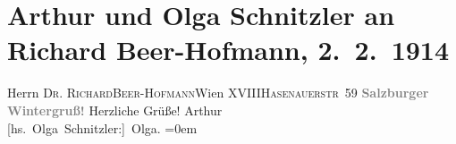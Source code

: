 

         
         \renewcommand{\erwaehntePersonen}{Personen: Richard Beer-Hofmann}
         \renewcommand{\erwaehnteOrte}{Orte: Hasenauerstraße, Salzburg, Wien, XVIII., Währing}
         \renewcommand{\erwaehnteWerke}{}
               \section[Arthur und Olga Schnitzler an Richard Beer-Hofmann, 2. 2. 1914]{ Arthur und Olga Schnitzler an Richard Beer-Hofmann,
                    2. 2. 1914}\nopagebreak{}\rehead{ }\begin{ledgroupsized}[t]{13cm}\normalsize\beginnumbering \toendnotes[C]{\smallbreak\pagebreak[2]} 
\pstart{}{\pb}Herrn \textsc{Dr. Richard}\pend{}\pstart{}\textsc{Beer-Hofmann}\pend{}\pstart{}Wien XVIII\pend{}\pstart{}\textsc{Hasenauerstr 59}\pend{}{\bigskip}\pstart
           \noindent{}\raggedleft{}{\pb}\textcolor{gray}{\textbf{Salzburger Wintergruß!}}\pend
           \pstart
           {\pb}Herzliche Grüße!\pend
           \pstart
           \spacefill\mbox{Arthur}{\\[\baselineskip]}\spacefill\mbox{{[}hs. Olga Schnitzler:{]} Olga.}\pend
           \leftskip=0em{}
         
         \endnumbering{}\end{ledgroupsized}  \newcommand{\dateiname}{L02165}\newcommand{\titel}{Arthur und Olga Schnitzler an Richard Beer-Hofmann, 2. 2. 1914}\newcommand{\editorInnen}{Martin Anton Müller und Gerd-Hermann Susen}
      